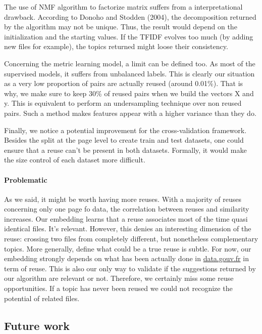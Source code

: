 \documentclass[a4paper]{article}
\begin{document}
	The use of \ac{NMF} algorithm to factorize matrix suffers from a interpretational drawback. According to Donoho and Stodden (2004), the decomposition returned by the algorithm may not be unique. Thus, the result would depend on the initialization and the starting values. If the \ac{TFIDF} evolves too much (by adding new files for example), the topics returned might loose their consistency. 
	
	Concerning the metric learning model, a limit can be defined too. As most of the supervised models, it suffers from unbalanced labels. This is clearly our situation as a very low proportion of pairs are actually reused (around 0.01\%). That is why, we make sure to keep 30\% of reused pairs when we build the vectors X and y. This is equivalent to perform an undersampling technique over non reused pairs. Such a method makes features appear with a higher variance than they do.
	
	Finally, we notice a potential improvement for the cross-validation framework. Besides the split at the page level to create train and test datasets, one could ensure that a reuse can't be present in both datasets. Formally, it would make the size control of each dataset more difficult. 
		
	\paragraph{Problematic}
	
	As we said, it might be worth having more reuses. With a majority of reuses concerning only one page fo data, the correlation between reuses and similarity increases. Our embedding learns that a reuse associates most of the time quasi identical files. It's relevant. However, this denies an interesting dimension of the reuse: crossing two files from completely different, but nonetheless complementary topics. More generally, define what could be a true reuse is subtle. For now, our embedding strongly depends on what has been actually done in \href{http://www.data.gouv.fr/fr/}{data.gouv.fr} in term of reuse. This is also our only way to validate if the suggestions returned by our algorithm are relevant or not. Therefore, we certainly miss some reuse opportunities. If a topic has never been reused we could not recognize the potential of related files.
	
	\subsection{Future work}
	
\end{document}
